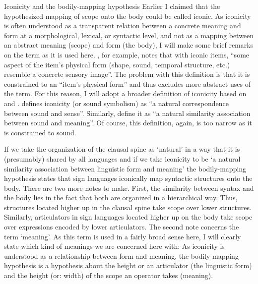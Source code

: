 \begin{exe}
\ex\label{smilingexample}\begin{xlist} 
\end{xlist}
\end{exe} 
%

\newpage 
\largerpage[2]
\begin{digression}{Iconicity and the bodily-mapping hypothesis}{}\label{iconicity}
\noindent Earlier I claimed that the hypothesized mapping of scope onto the body could be called iconic. As iconicity is often understood as a transparent relation between a concrete meaning and form at a morphological, lexical, or syntactic level, and not as a mapping between an abstract meaning (scope) and form (the body), I will make some brief remarks on the term as it is used here. \citet[20]{taub2004iconicity}, for example, notes that with iconic items, ``some aspect of the item's physical form (shape, sound, temporal structure, etc.) resemble a concrete sensory image''. The problem with this definition is that it is constrained to an ``item's physical form'' and thus excludes more abstract uses of the term. For this reason, I will adopt a broader definition of iconicity based on \citet{jespersen1922language} and \citet{jakobsonwaugh1979soundshape}. \citet[396]{jespersen1922language} defines iconicity (or sound symbolism)  as ``a natural correspondence between sound and sense''. Similarly, \citet[178]{jakobsonwaugh1979soundshape} define it as ``a natural similarity association between sound and meaning''. Of course, this definition, again, is too narrow as it is constrained to sound. 

If we take the organization of the clausal spine as `natural' in a way that it is (presumably) shared by all languages and if we take iconicity to be `a natural similarity association between linguistic form and meaning' the bodily-mapping hypothesis states that sign languages iconically map syntactic structures onto the body. There are two more notes to make. First, the similarity between syntax and the body lies in the fact that both are organized in a hierarchical way. Thus, structures located higher up in the clausal spine take scope over lower structures. Similarly, articulators in sign languages located higher up on the body take scope over expressions encoded by lower articulators. The second note concerns the term `meaning'. As this term is used in a fairly broad sense here, I will clearly state which kind of meanings we are concerned here with: As iconicity is understood as a relationship between form and meaning, the bodily-mapping hypothesis is a hypothesis about the height or an articulator (the linguistic form) and the height (or: width) of the scope an operator takes (meaning).


\end{digression}
